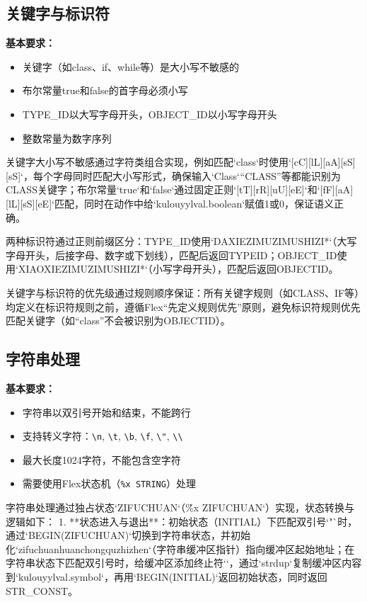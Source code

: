 \documentclass[twocolumn]{article}
\begin{document}
\subsection{关键字与标识符}

\textbf{基本要求：}
\begin{itemize}
    \item 关键字（如class、if、while等）是大小写不敏感的
    \item 布尔常量true和false的首字母必须小写
    \item TYPE\_ID以大写字母开头，OBJECT\_ID以小写字母开头
    \item 整数常量为数字序列
\end{itemize}

关键字大小写不敏感通过字符类组合实现，例如匹配`class`时使用`[cC][lL][aA][sS][sS]`，每个字母同时匹配大小写形式，确保输入`Class`“CLASS”等都能识别为CLASS关键字；布尔常量`true`和`false`通过固定正则`[tT][rR][uU][eE]`和`[fF][aA][lL][sS][eE]`匹配，同时在动作中给`kulouyylval.boolean`赋值1或0，保证语义正确。

两种标识符通过正则前缀区分：TYPE\_ID使用`{DAXIEZIMU}{ZIMUSHIZI}*`（大写字母开头，后接字母、数字或下划线），匹配后返回TYPEID；OBJECT\_ID使用`{XIAOXIEZIMU}{ZIMUSHIZI}*`（小写字母开头），匹配后返回OBJECTID。

关键字与标识符的优先级通过规则顺序保证：所有关键字规则（如CLASS、IF等）均定义在标识符规则之前，遵循Flex“先定义规则优先”原则，避免标识符规则优先匹配关键字（如“class”不会被识别为OBJECTID）。

\subsection{字符串处理}

\textbf{基本要求：}
\begin{itemize}
    \item 字符串以双引号开始和结束，不能跨行
    \item 支持转义字符：\texttt{\textbackslash n}, \texttt{\textbackslash t}, \texttt{\textbackslash b}, \texttt{\textbackslash f}, \texttt{\textbackslash"}, \texttt{\textbackslash\textbackslash}
    \item 最大长度1024字符，不能包含空字符
    \item 需要使用Flex状态机（\texttt{\%x STRING}）处理
\end{itemize}

字符串处理通过独占状态`ZIFUCHUAN`（\`\%x ZIFUCHUAN`）实现，状态转换与逻辑如下：
1. **状态进入与退出**：初始状态（INITIAL）下匹配双引号`"`时，通过`BEGIN(ZIFUCHUAN)`切换到字符串状态，并初始化`zifuchuanhuanchongquzhizhen`（字符串缓冲区指针）指向缓冲区起始地址；在字符串状态下匹配双引号时，给缓冲区添加终止符`\0`，通过`strdup`复制缓冲区内容到`kulouyylval.symbol`，再用`BEGIN(INITIAL)`返回初始状态，同时返回STR_CONST。
\end{document}
